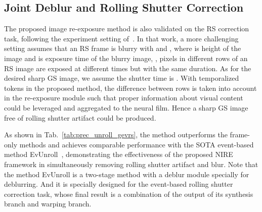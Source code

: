 \documentclass[10pt,twocolumn,letterpaper]{article}
\begin{document}
\subsection{Joint Deblur and Rolling Shutter Correction}

The proposed image re-exposure method is also validated on the RS correction task, following the experiment setting of~\cite{EvUnroll}.
In that work, a more challenging setting assumes that an RS frame is blurry with  and , where  is height of the image and  is exposure time of the blurry image, \ie, pixels in different rows of an RS image are exposed at different times but with the same duration.
As for the desired sharp GS image, we assume the shutter time is .
With temporalized tokens in the proposed method, the difference between rows is taken into account in the re-exposure module such that proper information about visual content could be leveraged and aggregated to the neural film. Hence a sharp GS image free of rolling shutter artifact could be produced.


\begin{table}[t!]
	\centering
\caption{Performance on joint deblur and RS correction.}
	\label{tab:prec_unroll_gevrs}
\end{table}

As shown in Tab.~\ref{tab:prec_unroll_gevrs},
the method outperforms the frame-only methods and achieves comparable performance with the SOTA event-based method EvUnroll~\cite{EvUnroll},
demonstrating the effectiveness of the proposed NIRE framework in simultaneously removing rolling shutter artifact and blur.
Note that the method EvUnroll is a two-stage method with a deblur module specially for deblurring. And it is specially designed for the
event-based rolling shutter correction task, whose final result is a combination of the output of its synthesis branch
and warping branch.
\end{document}
